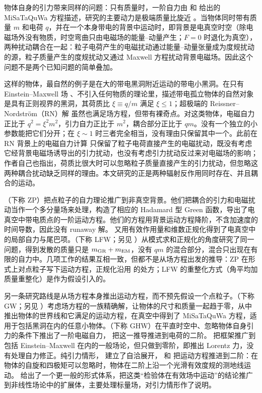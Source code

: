 \documentclass[11pt,a4paper]{ctexart}
\begin{document}
物体自身的引力带来同样的问题：只有质量时，一阶自力由 \citet{MinoSasakiTanaka1997} 和 \citet{QuinnWald1997} 给出的 MiSaTaQuWa 方程描述，研究的主要动力是极端质量比旋近 \citep{BarackPound2019}。当物体同时带有质量 $m$ 和电荷 $q$，并在一个本身带电的背景中运动时，即背景是电真空时空（除电磁场外没有物质，时空弯曲只由电磁场的能量--动量产生；$F=0$ 时退化为真空），两种扰动耦合在一起：粒子电荷产生的电磁扰动通过能量--动量张量成为度规扰动的源，粒子质量产生的度规扰动又通过 Maxwell 方程扰动背景电磁场。因此这个问题不是两个已知问题的简单叠加。

这样的物体，最自然的例子是在大的带电黑洞附近运动的带电小黑洞。在只有 Einstein--Maxwell 场 \citep{Maxwell1865,Einstein1916}、不引入任何物质的理论里，描述带电孤立物体的自然对象是具有正则视界的黑洞，其荷质比 $\xi\equiv q/m$ 满足 $\xi\le1$；超极端的 Reissner--Nordstr\"om（RN）解 \citep{Reissner1916,Nordstrom1918} 虽然也满足场方程，但带有裸奇点。对这类物体，电磁自力正比于 $q^2=\xi^2m^2$，引力自力正比于 $m^2$，耦合部分正比于 $qm$。没有一个独立的小参数能把它们分开；在 $\xi\sim1$ 时三者完全相当，没有理由只保留其中一个。此前在 RN 背景上的电磁自力计算 \citep{ZimmermanVegaPoissonHaas2013} 只保留了粒子电荷直接产生的电磁扰动，既没有考虑它经背景电磁场诱导出的引力扰动，也没有考虑引力扰动反过来对电磁场的影响；作者自己也指出，荷质比很大时可以忽略粒子质量直接产生的引力扰动，但忽略这两种耦合扰动缺乏同样的理由。本文研究的正是两种辐射反作用同时存在、并且耦合的运动。

\citet{ZimmermanPoisson2014}（下称 ZP）把点粒子的自力理论推广到非真空背景。他们把耦合的引力和电磁扰动当作一个多分量场来处理，构造了相应的 Hadamard 型 Green 函数，导出了电真空中带电质点的一阶运动方程。他们的方程用背景运动方程降阶，不含加速度的时间导数，因此没有 runaway 解。\citet{Zimmerman2015} 又用有效作用量和维数正规化得到了电真空中的局部自力与尾巴项。\citet{LinzFriedmanWiseman2014b}（下称 LFW；另见 \citealt{LinzFriedmanWiseman2014a}）从模式求和正规化的角度研究了同一问题，得到发散的质量只是 $m_{\rm GR}+m_{\rm EM}$，没有 $qm$ 的混合部分，混合只出现在有限的自力中。几项工作的结果互相一致，但都不是从场方程出发的推导：ZP 在形式上对点粒子写下运动方程，正规化沿用 \citet{DetweilerWhiting2003} 的处方；LFW 的重整化方式（角平均加质量重整化）是作为假设引入的。

另一条研究路线是从场方程本身推出运动方程，而不预先假设一个点粒子。\citet{GrallaWald2008}（下称 GW；另见 \citealt{GrallaWald2011erratum}）考虑场方程的一族精确解，让物体的尺寸和质量一起趋于零，从中推出物体的世界线和它满足的运动方程，在真空中得到了 MiSaTaQuWa 方程，适用于包括黑洞在内的任意小物体。\citet{GrallaHarteWald2009}（下称 GHW）在平直时空中、忽略物体自身引力的条件下推出了一阶电磁自力，\citet{MoxonFlanagan2018} 把这一推导推进到电荷的二阶。\citet{Gralla2010,Gralla2013} 把框架推广到包括 Einstein--Maxwell 在内的一般场论，但只做到零阶，即推出 Lorentz 力，没有处理自力修正。纯引力情形，\citet{Pound2010} 建立了自洽展开，\citet{Gralla2012} 和 \citet{Pound2012,Pound2017} 把运动方程推进到二阶：在物体的自旋和四极矩可以忽略时，物体在二阶上沿一个光滑有效度规的测地线运动。\citet{HarteBlancoFlanagan2025} 给出了一个更一般的形式体系，把这类“检验体在有效场中运动”的结论推广到非线性场论中的扩展体，主要处理标量场，对引力情形作了说明。
\end{document}
